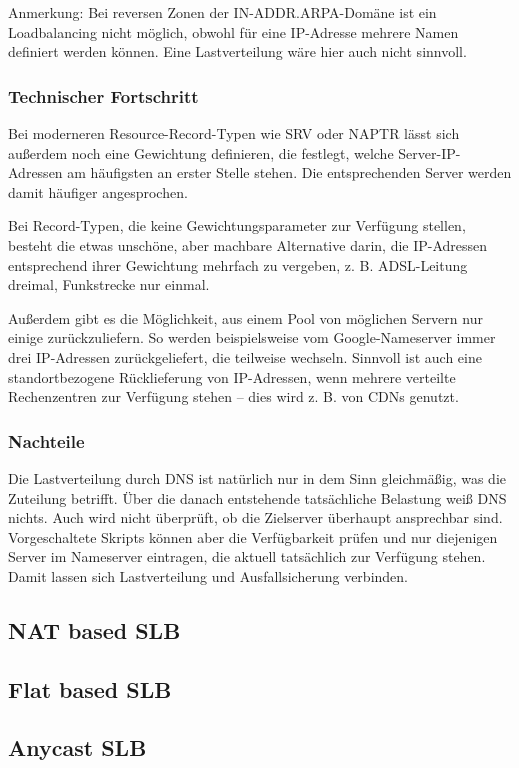 Anmerkung: Bei reversen Zonen der IN-ADDR.ARPA-Domäne ist ein Loadbalancing nicht möglich, obwohl für eine IP-Adresse mehrere Namen definiert werden können. Eine Lastverteilung wäre hier auch nicht sinnvoll.

\subsubsection{Technischer Fortschritt}
Bei moderneren Resource-Record-Typen wie SRV oder NAPTR lässt sich außerdem noch eine Gewichtung definieren, die festlegt, welche Server-IP-Adressen am häufigsten an erster Stelle stehen. Die entsprechenden Server werden damit häufiger angesprochen.

Bei Record-Typen, die keine Gewichtungsparameter zur Verfügung stellen, besteht die etwas unschöne, aber machbare Alternative darin, die IP-Adressen entsprechend ihrer Gewichtung mehrfach zu vergeben, z. B. ADSL-Leitung dreimal, Funkstrecke nur einmal.

Außerdem gibt es die Möglichkeit, aus einem Pool von möglichen Servern nur einige zurückzuliefern. So werden beispielsweise vom Google-Nameserver immer drei IP-Adressen zurückgeliefert, die teilweise wechseln. Sinnvoll ist auch eine standortbezogene Rücklieferung von IP-Adressen, wenn mehrere verteilte Rechenzentren zur Verfügung stehen – dies wird z. B. von CDNs genutzt.

\subsubsection{Nachteile}
Die Lastverteilung durch DNS ist natürlich nur in dem Sinn gleichmäßig, was die Zuteilung betrifft. Über die danach entstehende tatsächliche Belastung weiß DNS nichts. Auch wird nicht überprüft, ob die Zielserver überhaupt ansprechbar sind. Vorgeschaltete Skripts können aber die Verfügbarkeit prüfen und nur diejenigen Server im Nameserver eintragen, die aktuell tatsächlich zur Verfügung stehen. Damit lassen sich Lastverteilung und Ausfallsicherung verbinden.
\subsection{NAT based SLB}
\subsection{Flat based SLB}
\subsection{Anycast SLB}
